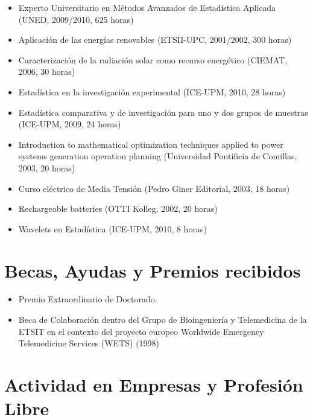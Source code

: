 \documentclass[article, a4paper]{memoir}
\begin{document}
\begin{itemize}
\item Experto Universitario en Métodos Avanzados de Estadística Aplicada (UNED, 2009/2010, 625 horas)

\item Aplicación de las energías renovables (ETSII-UPC, 2001/2002, 300 horas)

\item Caracterización de la radiación solar como recurso energético (CIEMAT, 2006, 30 horas)

\item Estadística en la investigación experimental (ICE-UPM, 2010, 28 horas)

\item Estadística comparativa y de investigación para uno y dos grupos de muestras (ICE-UPM, 2009, 24 horas)

\item Introduction to mathematical optimization techniques applied to power systems generation operation planning (Universidad Pontificia de Comillas, 2003, 20 horas)

\item Curso eléctrico de Media Tensión (Pedro Giner Editorial, 2003, 18 horas)

\item Rechargeable batteries (OTTI Kolleg, 2002, 20 horas)

\item Wavelets en Estadística (ICE-UPM, 2010, 8 horas)
\end{itemize}


\section{Becas, Ayudas y Premios recibidos}
\label{sec-13}

\begin{itemize}
\item Premio Extraordinario de Doctorado.
\item Beca de Colaboración dentro del Grupo de Bioingeniería y Telemedicina de la ETSIT en el contexto del proyecto europeo \guillemotleft{}Worldwide Emergency Telemedicine Services\guillemotright{} (WETS) (1998)
\end{itemize}


\section{Actividad en Empresas y Profesión Libre}
\label{sec-14}
\end{document}
